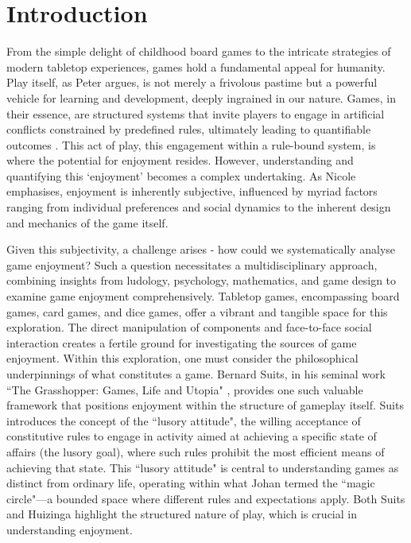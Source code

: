 \chapter{Introduction}
From the simple delight of childhood board games to the intricate strategies of modern tabletop experiences, games hold a fundamental appeal for humanity. Play itself, as Peter \textcite{grayWhatExactlyPlay2017} argues, is not merely a frivolous pastime but a powerful vehicle for learning and development, deeply ingrained in our nature. Games, in their essence, are structured systems that invite players to engage in artificial conflicts constrained by predefined rules, ultimately leading to quantifiable outcomes \autocite{puenteduraGameLearnIntroduction}. This act of play, this engagement within a rule-bound system, is where the potential for enjoyment resides. However, understanding and quantifying this `enjoyment' becomes a complex undertaking.  As Nicole \textcite{lazzaroWhyWePlay2004a} emphasises, enjoyment is inherently subjective, influenced by myriad factors ranging from individual preferences and social dynamics to the inherent design and mechanics of the game itself.

Given this subjectivity, a challenge arises - how could we systematically analyse game enjoyment? Such a question necessitates a multidisciplinary approach, combining insights from ludology, psychology, mathematics, and game design to examine game enjoyment comprehensively. Tabletop games, encompassing board games, card games, and dice games, offer a vibrant and tangible space for this exploration. The direct manipulation of components and face-to-face social interaction creates a fertile ground for investigating the sources of game enjoyment. Within this exploration, one must consider the philosophical underpinnings of what constitutes a game. Bernard Suits, in his seminal work ``The Grasshopper: Games, Life and Utopia" \textcite{suitsGrasshopperGamesLife1978}, provides one such valuable framework that positions enjoyment within the structure of gameplay itself. Suits introduces the concept of the ``lusory attitude", the willing acceptance of constitutive rules to engage in activity aimed at achieving a specific state of affairs (the lusory goal), where such rules prohibit the most efficient means of achieving that state. This ``lusory attitude" is central to understanding games as distinct from ordinary life, operating within what Johan \textcite{huizingaHomoLudensStudy1998} termed the ``magic circle"—a bounded space where different rules and expectations apply. Both Suits and Huizinga highlight the structured nature of play, which is crucial in understanding enjoyment. 

